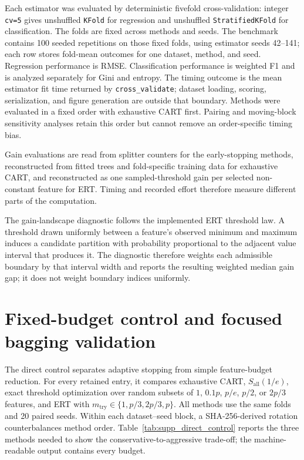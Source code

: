 \documentclass[final,5p,times,twocolumn]{elsarticle}
\begin{document}
\begin{table}[t]
\centering
\small
\caption{Characteristics of the retained PMLB entries. Entries are Q1/median/Q3 with ranges in parentheses.}
\label{tab:supp_datasets}

\end{table}

Each estimator was evaluated by deterministic fivefold cross-validation:
integer \texttt{cv=5} gives unshuffled \texttt{KFold} for regression and
unshuffled \texttt{StratifiedKFold} for classification.  The folds are fixed
across methods and seeds.  The benchmark contains 100 seeded repetitions on those
fixed folds, using estimator seeds 42--141; each row stores fold-mean outcomes
for one dataset, method, and seed.  Regression performance is RMSE.
Classification performance is weighted F1 and is analyzed separately for Gini
and entropy.  The timing outcome is the mean estimator fit time returned by
\texttt{cross\_validate}; dataset loading, scoring,
serialization, and figure generation are outside that boundary.
Methods were evaluated in a fixed order with exhaustive CART first.  Pairing and
moving-block sensitivity analyses retain this order but cannot remove an
order-specific timing bias.

Gain evaluations are read from splitter counters for the early-stopping
methods, reconstructed from fitted trees and fold-specific training data for
exhaustive CART, and reconstructed as one sampled-threshold gain per selected
non-constant feature for ERT.  Timing and recorded effort therefore measure
different parts of the computation.

The gain-landscape diagnostic follows the implemented ERT threshold law.  A
threshold drawn uniformly between a feature's observed minimum and maximum
induces a candidate partition with probability proportional to the adjacent
value interval that produces it.  The diagnostic therefore weights each
admissible boundary by that interval width and reports the resulting weighted
median gain gap; it does not weight boundary indices uniformly.

\section{Fixed-budget control and focused bagging validation}
\label{sec:supp_controls}

The direct control separates adaptive stopping from simple feature-budget
reduction.  For every retained entry, it compares exhaustive CART,
\(S_{\mathrm{all}}(1/e)\), exact threshold optimization over random subsets of
\(1\), \(0.1p\), \(p/e\), \(p/2\), or \(2p/3\) features, and ERT with
\(m_{\mathrm{try}}\in\{1,p/3,2p/3,p\}\).  All methods use the same folds and 20
paired seeds.  Within each dataset--seed block, a SHA-256-derived rotation
counterbalances method order.  Table~\ref{tab:supp_direct_control} reports the
three methods needed to show the conservative-to-aggressive trade-off; the
machine-readable output contains every budget.
\end{document}
